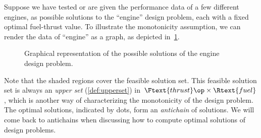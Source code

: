 \begin{example}
  Suppose we have tested or are given the performance data of a few different engines, as possible solutions to the ``engine'' design problem, each with a fixed optimal fuel-thrust value. To illustrate the monotonicity assumption, we can render the data of ``engine'' as a graph, as depicted in~\cref{fig:solenginedp}.
  \begin{figure}[h!]
    \begin{center}
    \end{center}
    \caption{Graphical representation of the possible solutions of the engine design problem. \label{fig:solenginedp}}
  \end{figure}

  Note that the shaded regions cover the feasible solution set. This feasible solution set is always an \emph{upper set} (\cref{def:upperset}) in~$\Ftext{thrust}\op \times \Rtext{fuel}$, which is another way of characterizing the monotonicity of the design problem. The optimal solutions, indicated by dots, form an \emph{antichain} of solutions. We will come back to antichains when discussing how to compute optimal solutions of design problems.
\end{example}




